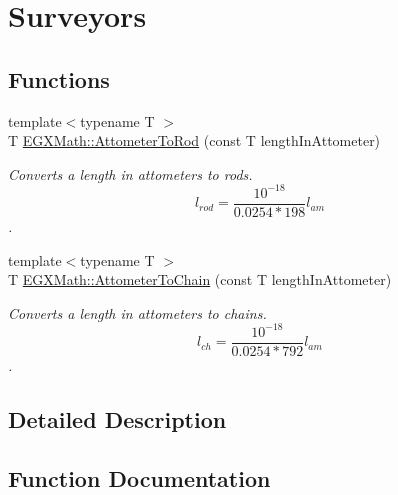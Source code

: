 \hypertarget{group___e_g_x_math-_conversions-_length_conversions-_s_i-_attometer-_surveyors}{}\section{Surveyors}
\label{group___e_g_x_math-_conversions-_length_conversions-_s_i-_attometer-_surveyors}
\subsection*{Functions}
\begin{DoxyCompactItemize}
\item 
{\footnotesize template$<$typename T $>$ }\\T \mbox{\hyperlink{group___e_g_x_math-_conversions-_length_conversions-_s_i-_attometer-_surveyors_ga4bdcb3e42e19c5f1ca38ee513654dfa4}{E\+G\+X\+Math\+::\+Attometer\+To\+Rod}} (const T length\+In\+Attometer)
\begin{DoxyCompactList}\small\item\em Converts a length in attometers to rods. \[ l_{rod}= \frac{10^{-18}}{0.0254 * 198} l_{am} \]. \end{DoxyCompactList}\item 
{\footnotesize template$<$typename T $>$ }\\T \mbox{\hyperlink{group___e_g_x_math-_conversions-_length_conversions-_s_i-_attometer-_surveyors_gab0d950b7446370314d85395a073f2e73}{E\+G\+X\+Math\+::\+Attometer\+To\+Chain}} (const T length\+In\+Attometer)
\begin{DoxyCompactList}\small\item\em Converts a length in attometers to chains. \[ l_{ch}= \frac{10^{-18}}{0.0254 * 792} l_{am} \]. \end{DoxyCompactList}\end{DoxyCompactItemize}


\subsection{Detailed Description}


\subsection{Function Documentation}
\mbox{\label{group___e_g_x_math-_conversions-_length_conversions-_s_i-_attometer-_surveyors_gab0d950b7446370314d85395a073f2e73}} 
